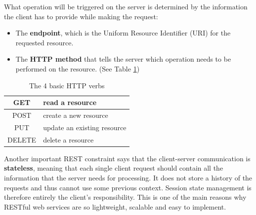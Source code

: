 What operation will be triggered on the server is determined by the information the client has to provide while making the request:

\begin{itemize}
    \item The \textbf{endpoint}, which is the Uniform Resource Identifier (URI) for the requested resource.
    \item The \textbf{HTTP method} that tells the server which operation needs to be performed on the resource. (See Table \ref{httpVerbs})
\end{itemize}

\begin{table}[H]
    \centering
    \begin{tabular}{|c|l|}
        \hline
        GET    & read a resource             \\ \hline
        POST   & create a new resource       \\ \hline
        PUT    & update an existing resource \\ \hline
        DELETE & delete a resource           \\ \hline
    \end{tabular}
    \caption{The 4 basic HTTP verbs}
    \label{httpVerbs}
\end{table}

Another important REST constraint says that the client-server communication is \textbf{stateless}, meaning that each single client request should contain all the information that the server needs for processing. It does not store a history of the requests and thus cannot use some previous context. Session state management is therefore entirely the client's responsibility. This is one of the main reasons why RESTful web services are so lightweight, scalable and easy to implement.







